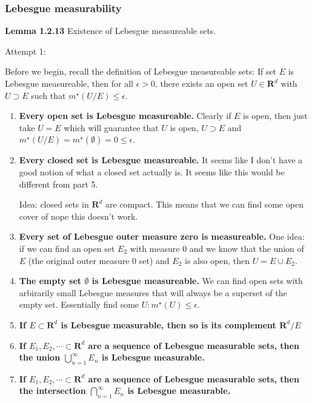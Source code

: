 \documentclass[answers,12pt]{exam}
\begin{document}
\subsubsection{Lebesgue measurability}
\textbf{Lemma 1.2.13} Existence of Lebesgue measureable sets.
\begin{solution}
Attempt 1:

Before we begin, recall the definition of Lebesgue measureable sets:
If set $E$ is Lebesgue measureable, then for all $\epsilon>0$, there exists an open set $U \in \mathbf{R}^d$ with $U \supset E$ such that $m^{\star}(U/E) \leq \epsilon$. 
\begin{enumerate}
    \item \textbf{Every open set is Lebesgue measureable.}
    Clearly if $E$ is open, then just take $U=E$ which will guarantee that $U$ is open, $U \supset E$ and $m^{\star}(U/E)=m^{\star}(\emptyset) = 0 \leq \epsilon$.
    \item \textbf{Every closed set is Lebesgue measureable.}
    It seems like I don't have a good notion of what a closed set actually is.
    It seems like this would be different from part 5.
    
    Idea: closed sets in $\mathbf{R}^d$ are compact. 
    This means that we can find some open cover of nope this doesn't work.
    
    \item \textbf{Every set of Lebesgue outer measure zero is measureable.}
    One idea: if we can find an open set $E_2$ with measure 0 and we know that the union of $E$ (the original outer measure 0 set) and $E_2$ is also open, then $U=E \cup E_2$.
    \item \textbf{The empty set $\emptyset$ is Lebesgue measureable.}
    We can find open sets with arbirarily small Lebesgue measures that will always be a superset of the empty set.
    Essentially find some $U: m^{\star}(U) \leq \epsilon$.
    \item \textbf{If $E \subset \mathbf{R}^d$ is Lebesgue measurable, then so is its complement $\mathbf{R}^d/E$}
    \item \textbf{If $E_1, E_2, \cdots \subset \mathbf{R}^d$ are a sequence of Lebesgue measurable sets, then the union $\bigcup_{n=1}^{\infty}E_n$ is Lebesgue measurable.}
    \item \textbf{If $E_1, E_2, \cdots \subset \mathbf{R}^d$ are a sequence of Lebesgue measurable sets, then the intersection $\bigcap_{n=1}^{\infty}E_n$ is Lebesgue measurable.}
\end{enumerate}
\end{solution}
\end{document}
